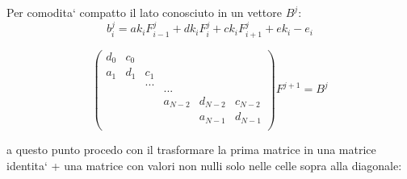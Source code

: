 \documentclass[]{article}
\newcommand{\lr}[3]{\ensuremath{\left#1 #3 \right#2}}
\newcommand{\lrt}[1]{\lr{(}{)}{#1}}
\numberwithin{equation}{subsection}
\begin{document}
Per comodita` compatto il lato conosciuto in un vettore $B^j$:
$$b_i^j = ak_i F_{i-1}^{j}+ dk_i F_{i}^{j} + ck_i F_{i+1}^{j} + ek_i-e_i$$

$$\lrt{\begin{array}{cccccc}
d_0&c_0&&&\\
a_1&d_1&c_1&\\
&&...&&&\\
&&&...&&\\
&&&a_{N-2}&d_{N-2}&c_{N-2}\\
&&&&a_{N-1}&d_{N-1}\\
\end{array}} F^{j+1} = 
B^j
$$

a questo punto procedo con il trasformare la prima matrice in una matrice identita` + una matrice con valori non nulli solo nelle celle sopra alla diagonale:
\end{document}

